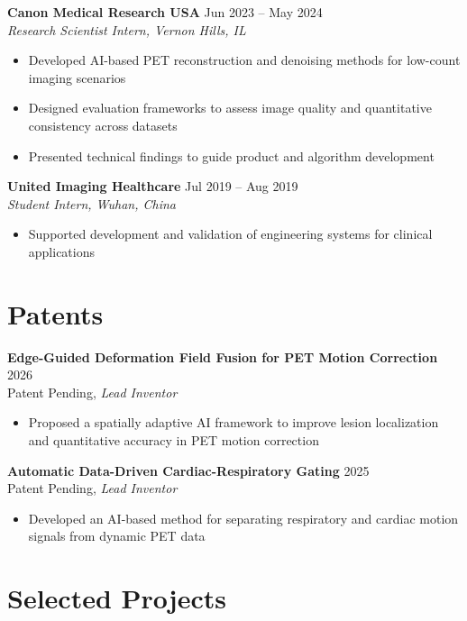 \textbf{Canon Medical Research USA} \hfill Jun 2023 -- May 2024 \\
\textit{Research Scientist Intern, Vernon Hills, IL}
\begin{itemize}[leftmargin=*]
\item Developed AI-based PET reconstruction and denoising methods for low-count imaging scenarios
\item Designed evaluation frameworks to assess image quality and quantitative consistency across datasets
\item Presented technical findings to guide product and algorithm development
\end{itemize}

\textbf{United Imaging Healthcare} \hfill Jul 2019 -- Aug 2019 \\
\textit{Student Intern, Wuhan, China}
\begin{itemize}[leftmargin=*]
\item Supported development and validation of engineering systems for clinical applications
\end{itemize}

\section{Patents}
\textbf{Edge-Guided Deformation Field Fusion for PET Motion Correction} \hfill 2026 \\
Patent Pending, \textit{Lead Inventor}
\begin{itemize}[leftmargin=*]
\item Proposed a spatially adaptive AI framework to improve lesion localization and quantitative accuracy in PET motion correction
\end{itemize}

\textbf{Automatic Data-Driven Cardiac-Respiratory Gating} \hfill 2025 \\
Patent Pending, \textit{Lead Inventor}
\begin{itemize}[leftmargin=*]
\item Developed an AI-based method for separating respiratory and cardiac motion signals from dynamic PET data
\end{itemize}

\section{Selected Projects}

